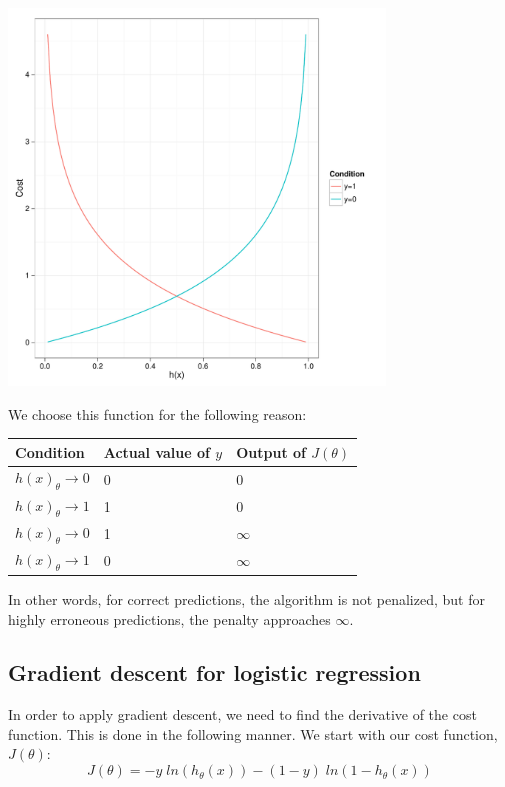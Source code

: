 \documentclass[11pt]{article}
\begin{document}
\includegraphics[width=10cm]{./plots/sigmoid-cost.pdf}

We choose this function for the following reason:

\begin{center}
\begin{tabular}{lll}
 Condition                      &  Actual value of \(y\)  &  Output of \(J(\theta)\)  \\
\hline
 \(h(x)_\theta \rightarrow 0\)  &                      0  &  0                        \\
 \(h(x)_\theta \rightarrow 1\)  &                      1  &  0                        \\
\hline
 \(h(x)_\theta \rightarrow 0\)  &                      1  &  \(\infty\)               \\
 \(h(x)_\theta \rightarrow 1\)  &                      0  &  \(\infty\)               \\
\end{tabular}
\end{center}



In other words, for correct predictions, the algorithm is not penalized, but for
highly erroneous predictions, the penalty approaches \(\infty\).
\subsection{Gradient descent for logistic regression}
\label{sec-3-3}

In order to apply gradient descent, we need to find the derivative of the cost
function. This is done in the following manner. We start with our cost function,
\(J(\theta)\): 
\[
J(\theta) = -y \; ln(h_\theta(x)) - (1-y) \; ln(1-h_\theta(x))
\]
\end{document}
